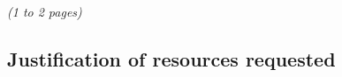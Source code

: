 \documentclass [a4paper, 12pt]{article}
\begin{document}





\textit{(1 to 2 pages)}
\newpage
\subsection{Justification of resources requested}
\label{sec:just}
\end{document}
